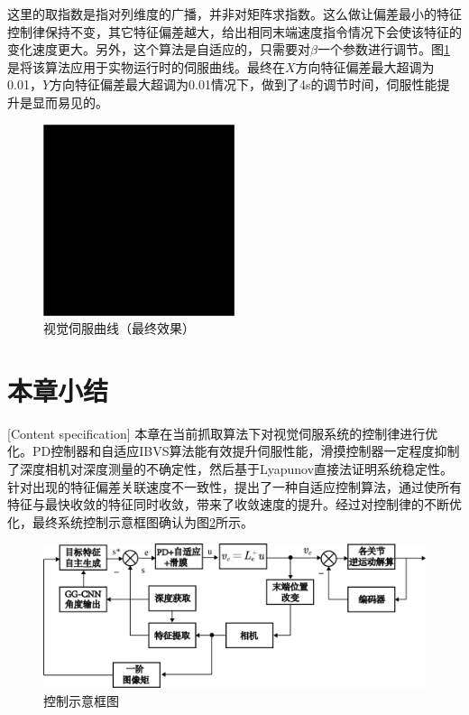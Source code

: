 \documentclass[fontset=fandol,type=bachelor,campus=harbin,bsmainpagenumberline=true]{hithesisbook}
\begin{document}
这里的取指数是指对列维度的广播，并非对矩阵求指数。这么做让偏差最小的特征控制律保持不变，其它特征偏差越大，给出相同末端速度指令情况下会使该特征的变化速度更大。另外，这个算法是自适应的，只需要对$\beta$一个参数进行调节。图\ref{视觉伺服曲线（最终效果）}是将该算法应用于实物运行时的伺服曲线。最终在$X$方向特征偏差最大超调为0.01，$Y$方向特征偏差最大超调为0.01情况下，做到了4s的调节时间，伺服性能提升是显而易见的。
\begin{figure}[h]
	\centering
	\includegraphics[width=0.5\textwidth]{chapter5/替身}
	\caption{视觉伺服曲线（最终效果）}
	\label{视觉伺服曲线（最终效果）}
\end{figure}


\section{本章小结}[Content specification]
本章在当前抓取算法下对视觉伺服系统的控制律进行优化。PD控制器和自适应IBVS算法能有效提升伺服性能，滑摸控制器一定程度抑制了深度相机对深度测量的不确定性，然后基于Lyapunov直接法证明系统稳定性。针对出现的特征偏差关联速度不一致性，提出了一种自适应控制算法，通过使所有特征与最快收敛的特征同时收敛，带来了收敛速度的提升。经过对控制律的不断优化，最终系统控制示意框图确认为图\ref{控制示意框图}所示。
\begin{figure}[h]
	\centering
	\includegraphics[width=1.0\textwidth]{chapter5/控制示意框图}
	\caption{控制示意框图}
	\label{控制示意框图}
\end{figure}
\end{document}
